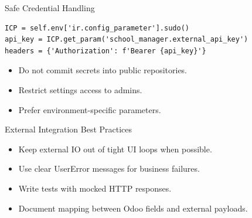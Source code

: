 \begin{frame}[fragile]{Safe Credential Handling}
\begin{lstlisting}
ICP = self.env['ir.config_parameter'].sudo()
api_key = ICP.get_param('school_manager.external_api_key')
headers = {'Authorization': f'Bearer {api_key}'}
\end{lstlisting}
	\begin{itemize}
		\item Do not commit secrets into public repositories.
		\item Restrict settings access to admins.
		\item Prefer environment-specific parameters.
	\end{itemize}
\end{frame}

\begin{frame}{External Integration Best Practices}
	\begin{itemize}
		\item Keep external IO out of tight UI loops when possible.
		\item Use clear UserError messages for business failures.
		\item Write tests with mocked HTTP responses.
		\item Document mapping between Odoo fields and external payloads.
	\end{itemize}
\end{frame}
